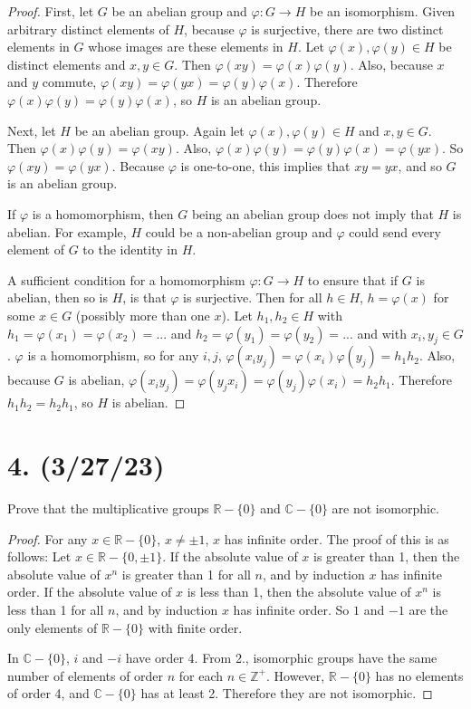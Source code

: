 \documentclass{article}
\begin{document}
\begin{proof}
    First, let $G$ be an abelian group and $\varphi: G \rightarrow H$ be an isomorphism. Given arbitrary distinct elements of $H$, because $\varphi$ is surjective, there are two distinct elements in $G$ whose images are these elements in $H$. Let $\varphi(x), \varphi(y) \in H$ be distinct elements and $x, y \in G$. Then $\varphi(xy) = \varphi(x)\varphi(y)$. Also, because $x$ and $y$ commute, $\varphi(xy) = \varphi(yx) = \varphi(y)\varphi(x)$. Therefore $\varphi(x)\varphi(y) = \varphi(y)\varphi(x)$, so $H$ is an abelian group.

    Next, let $H$ be an abelian group. Again let $\varphi(x), \varphi(y) \in H$ and $x, y \in G$. Then $\varphi(x)\varphi(y) = \varphi(xy)$. Also, $\varphi(x)\varphi(y) = \varphi(y)\varphi(x) = \varphi(yx)$. So $\varphi(xy) = \varphi(yx)$. Because $\varphi$ is one-to-one, this implies that $xy = yx$, and so $G$ is an abelian group.

    If $\varphi$ is a homomorphism, then $G$ being an abelian group does not imply that $H$ is abelian. For example, $H$ could be a non-abelian group and $\varphi$ could send every element of $G$ to the identity in $H$.

    A sufficient condition for a homomorphism $\varphi: G \rightarrow H$ to ensure that if $G$ is abelian, then so is $H$, is that $\varphi$ is surjective. Then for all $h \in H$, $h = \varphi(x)$ for some $x \in G$ (possibly more than one $x$). Let $h_1, h_2 \in H$ with $h_1 = \varphi(x_1) = \varphi(x_2) = ...$ and $h_2 = \varphi(y_1) = \varphi(y_2) = ...$ and with $x_i, y_j \in G$. $\varphi$ is a homomorphism, so for any $i, j$, $\varphi(x_i y_j) = \varphi(x_i) \varphi(y_j) = h_1 h_2$. Also, because $G$ is abelian, $\varphi(x_i y_j) = \varphi(y_j x_i) = \varphi(y_j) \varphi(x_i) = h_2 h_1$. Therefore $h_1 h_2 = h_2 h_1$, so $H$ is abelian.
\end{proof}

\section*{4. (3/27/23)}

Prove that the multiplicative groups $\mathbb{R} - \{0\}$ and $\mathbb{C} - \{0\}$ are not isomorphic.

\begin{proof}
    For any $x \in \mathbb{R} - \{0\}$, $x \neq \pm{1}$, $x$ has infinite order. The proof of this is as follows: Let $x \in \mathbb{R} - \{0, \pm{1}\}$. If the absolute value of $x$ is greater than 1, then the absolute value of $x^n$ is greater than 1 for all $n$, and by induction $x$ has infinite order. If the absolute value of $x$ is less than 1, then the absolute value of $x^n$ is less than 1 for all $n$, and by induction $x$ has infinite order. So $1$ and $-1$ are the only elements of $\mathbb{R} - \{0\}$ with finite order.

    In $\mathbb{C} - \{0\}$, $i$ and $-i$ have order 4. From 2., isomorphic groups have the same number of elements of order $n$ for each $n \in \mathbb{Z}^+$. However, $\mathbb{R} - \{0\}$ has no elements of order 4, and $\mathbb{C} - \{0\}$ has at least 2. Therefore they are not isomorphic.
\end{proof}
\end{document}
